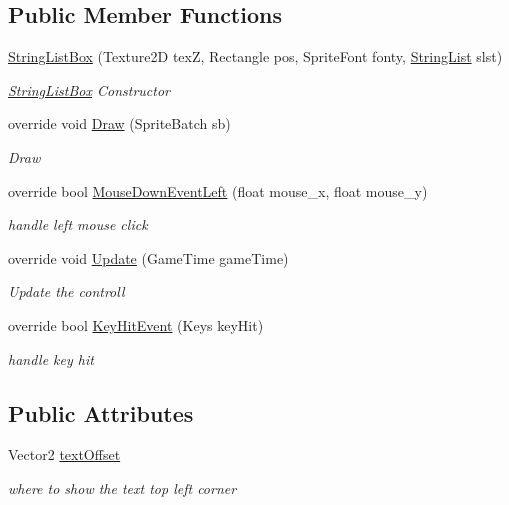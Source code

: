 \subsection*{Public Member Functions}
\begin{DoxyCompactItemize}
\item 
\mbox{\hyperlink{class_r_c___framework_1_1_string_list_box_af83ff949ee4069b3add0b4a5f4ae3367}{String\+List\+Box}} (Texture2D texZ, Rectangle pos, Sprite\+Font fonty, \mbox{\hyperlink{class_r_c___framework_1_1_string_list}{String\+List}} slst)
\begin{DoxyCompactList}\small\item\em \mbox{\hyperlink{class_r_c___framework_1_1_string_list_box}{String\+List\+Box}} Constructor \end{DoxyCompactList}\item 
override void \mbox{\hyperlink{class_r_c___framework_1_1_string_list_box_a474da32176236c6a1f36129c8cac0386}{Draw}} (Sprite\+Batch sb)
\begin{DoxyCompactList}\small\item\em Draw \end{DoxyCompactList}\item 
override bool \mbox{\hyperlink{class_r_c___framework_1_1_string_list_box_aabe8c72a90d47c67eb162c76b1e7f79c}{Mouse\+Down\+Event\+Left}} (float mouse\+\_\+x, float mouse\+\_\+y)
\begin{DoxyCompactList}\small\item\em handle left mouse click \end{DoxyCompactList}\item 
override void \mbox{\hyperlink{class_r_c___framework_1_1_string_list_box_a8466c2c89cf05f46f4abb281d1517ff5}{Update}} (Game\+Time game\+Time)
\begin{DoxyCompactList}\small\item\em Update the controll \end{DoxyCompactList}\item 
override bool \mbox{\hyperlink{class_r_c___framework_1_1_string_list_box_a8b449ef1c2c786786b7e6cf52f416750}{Key\+Hit\+Event}} (Keys key\+Hit)
\begin{DoxyCompactList}\small\item\em handle key hit \end{DoxyCompactList}\end{DoxyCompactItemize}
\subsection*{Public Attributes}
\begin{DoxyCompactItemize}
\item 
Vector2 \mbox{\hyperlink{class_r_c___framework_1_1_string_list_box_ad40023b2817f55bdf400705a24fd1f9e}{text\+Offset}}
\begin{DoxyCompactList}\small\item\em where to show the text top left corner \end{DoxyCompactList}\end{DoxyCompactItemize}
